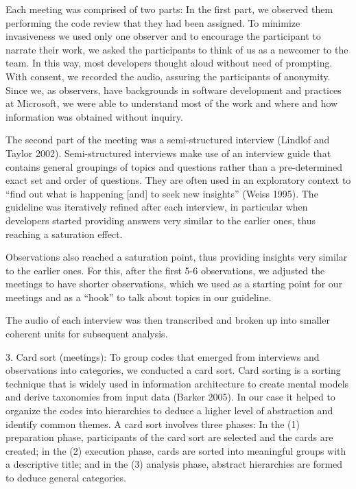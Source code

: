 \documentclass[conference]{IEEEtran}
\begin{document}
Each meeting was comprised of two parts: In the first part, we observed them
performing the code review that they had been assigned. To minimize
invasiveness we used only one observer and to encourage the participant to
narrate their work, we asked the participants to think of us as a newcomer to
the team. In this way, most developers thought aloud without need of prompting.
With consent, we recorded the audio, assuring the participants of anonymity.
Since we, as observers, have backgrounds in software development and practices
at Microsoft, we were able to understand most of the work and where and how
information was obtained without inquiry. 

The second part of the meeting was a semi-structured interview (Lindlof and
Taylor 2002). Semi-structured interviews make use of an interview guide that
contains general groupings of topics and questions rather than a pre-determined
exact set and order of questions.  They are often used in an exploratory
context to ``find out what is happening [and] to seek new insights'' (Weiss
1995). The guideline was iteratively refined after each interview, in
particular when developers started providing answers very similar to the
earlier ones, thus reaching a saturation effect.

Observations also reached a saturation point, thus providing insights very similar to the earlier ones. For this, after the first 5-6 observations, we adjusted the meetings to have shorter observations, which we used as a starting point for our meetings and as a ``hook'' to talk about topics in our guideline.

The audio of each interview was then transcribed and broken up into smaller
coherent units for subsequent analysis.

3. Card sort (meetings): To group codes that emerged from interviews and
observations into categories, we conducted a card sort. Card sorting is a
sorting technique that is widely used in information architecture to create
mental models and derive taxonomies from input data (Barker 2005). In our case
it helped to organize the codes into hierarchies to deduce a higher level of
abstraction and identify common themes. A card sort involves three phases: In
the (1) preparation phase, participants of the card sort are selected and the
cards are created; in the (2) execution phase, cards are sorted into meaningful
groups with a descriptive title; and in the (3) analysis phase, abstract
hierarchies are formed to deduce general categories.
\end{document}
